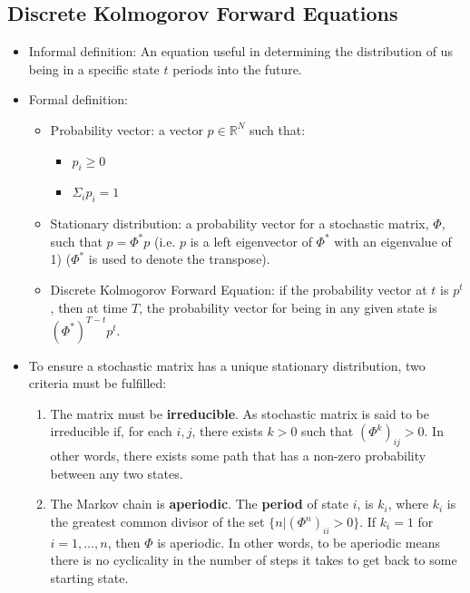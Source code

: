 \documentclass{article}
\begin{document}
\subsection{Discrete Kolmogorov Forward Equations}
\begin{itemize}
    \item Informal definition: An equation useful in determining the distribution
    of us being in a specific state $ t $ periods into the future. 
    \item Formal definition: 
    \begin{itemize}
        \item Probability vector: a vector $ p \in \mathbb{R}^N $ such that:
        \begin{itemize}
            \item $ p_i \ge 0 $
            \item $ \Sigma_i p_i = 1 $
        \end{itemize}
        \item Stationary distribution: a probability vector for a stochastic
        matrix, $ \Phi $, such that $ p = \Phi^* p $ (i.e. $ p $ is a left
        eigenvector of $ \Phi^* $ with an eigenvalue of 1) ($ \Phi^* $ is used 
        to denote the transpose).
        \item Discrete Kolmogorov Forward Equation: if the probability vector at
        $ t $ is $ p^t $, then at time $ T $, the probability vector for being
        in any given state is $ {(\Phi^*)}^{T-t}p^t $.
    \end{itemize}
    \item To ensure a stochastic matrix has a unique stationary distribution, 
    two criteria must be fulfilled:
    \begin{enumerate}
        \item The matrix must be \textbf{irreducible}. As stochastic matrix is said to be 
        irreducible if, for each $ i,j $, there exists $ k > 0 $ such that $ 
        {(\Phi^k)}_{ij} > 0$. In other words, there exists some path that has a 
        non-zero probability between any two states.
        \item The Markov chain is \textbf{aperiodic}. The \textbf{period} of 
        state $ i $, is $ k_i $, where $ k_i $ is the greatest common divisor of 
        the set $ \{n | {(\Phi^n)}_{ii} > 0\} $. If $ k_i = 1 $ for $ i = 1, 
        \dots, n $, then $ \Phi $ is aperiodic. In other words, to be aperiodic 
        means there is no cyclicality in the number of steps it takes to get 
        back to some starting state. 

\end{enumerate}
\end{itemize}
\end{document}
